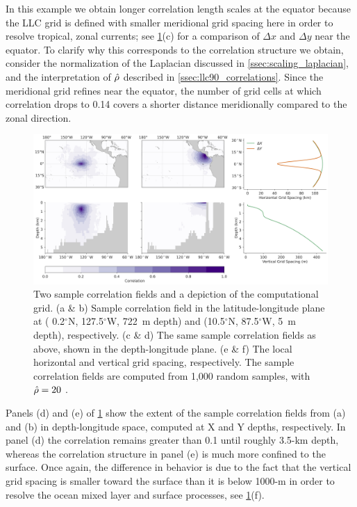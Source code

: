In this example we obtain longer correlation length scales at the equator
because the LLC grid is defined with smaller meridional grid spacing here in
order to resolve tropical, zonal currents;
see \cref{fig:llc90_correlation_maps}(c) for a comparison of $\Delta x $ and
$\Delta y$ near the equator.
To clarify why this corresponds to the correlation structure we obtain,
consider the normalization of the Laplacian discussed in
\cref{ssec:scaling_laplacian}, and the interpretation of $\hat{\rho}$ described
in \cref{ssec:llc90_correlations}.
Since the meridional grid refines near the equator, the number of grid cells at
which correlation drops to 0.14 covers a shorter distance meridionally compared
to the zonal direction.

\begin{figure}
    \centering
    \includegraphics[width=\textwidth]{../figures/huge_correlation_map.jpg}
    \caption{Two sample correlation fields and a depiction of the computational
        grid.
        (a \& b) Sample correlation field in the latitude-longitude plane at
        ( 0.2$^\circ$N, 127.5$^\circ$W, 722~m depth) and
        (10.5$^\circ$N,  87.5$^\circ$W,   5~m depth), respectively.
        (c \& d) The same sample correlation fields as above, shown in the
        depth-longitude plane.
        (e \& f) The local horizontal and vertical grid spacing, respectively.
        The sample correlation fields are computed from 1,000 random samples,
        with $\hat{\rho} = 20$ .
    }
    \label{fig:llc90_correlation_maps}
\end{figure}

Panels (d) and (e) of \cref{fig:llc90_correlation_maps} show the extent of the
sample correlation fields from (a) and (b) in depth-longitude space,
computed at X and Y depths, respectively.
In panel (d) the correlation remains greater than 0.1 until roughly 3.5-km
depth, whereas the correlation structure in panel (e) is much more confined to
the surface.
Once again, the difference in behavior is due to the fact that the vertical grid
spacing is smaller toward the surface than it is below 1000-m in order to
resolve the ocean mixed layer and surface processes, see
\cref{fig:llc90_correlation_maps}(f).

